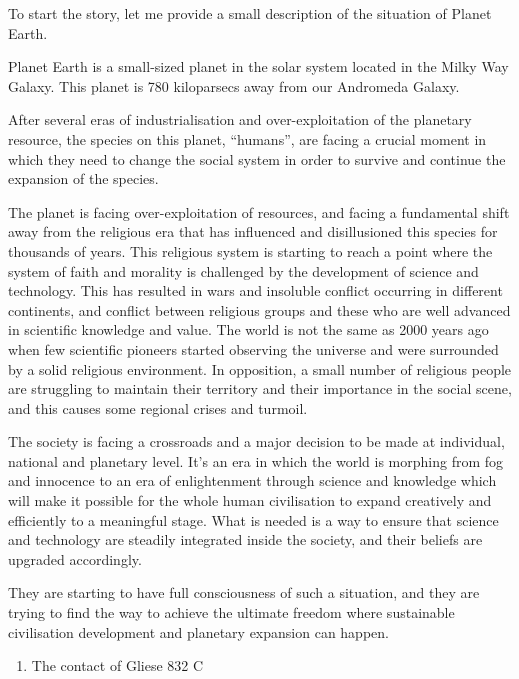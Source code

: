 To start the story, let me provide a small description of the situation
of Planet Earth.

Planet Earth is a small-sized planet in the solar system located in the
Milky Way Galaxy. This planet is 780 kiloparsecs away from our Andromeda
Galaxy.

After several eras of industrialisation and over-exploitation of the
planetary resource, the species on this planet, ``humans'', are facing a
crucial moment in which they need to change the social system in order
to survive and continue the expansion of the species.

The planet is facing over-exploitation of resources, and facing a
fundamental shift away from the religious era that has influenced and
disillusioned this species for thousands of years. This religious system
is starting to reach a point where the system of faith and morality is
challenged by the development of science and technology. This has
resulted in wars and insoluble conflict occurring in different
continents, and conflict between religious groups and these who are well
advanced in scientific knowledge and value. The world is not the same as
2000 years ago when few scientific pioneers started observing the
universe and were surrounded by a solid religious environment. In
opposition, a small number of religious people are struggling to
maintain their territory and their importance in the social scene, and
this causes some regional crises and turmoil.

The society is facing a crossroads and a major decision to be made at
individual, national and planetary level. It's an era in which the world
is morphing from fog and innocence to an era of enlightenment through
science and knowledge which will make it possible for the whole human
civilisation to expand creatively and efficiently to a meaningful stage.
What is needed is a way to ensure that science and technology are
steadily integrated inside the society, and their beliefs are upgraded
accordingly.

They are starting to have full consciousness of such a situation, and
they are trying to find the way to achieve the ultimate freedom where
sustainable civilisation development and planetary expansion can happen.

\begin{enumerate}
\def\labelenumi{\arabic{enumi}.}
\setcounter{enumi}{3}
\tightlist
\item
  The contact of Gliese 832 C
\end{enumerate}

